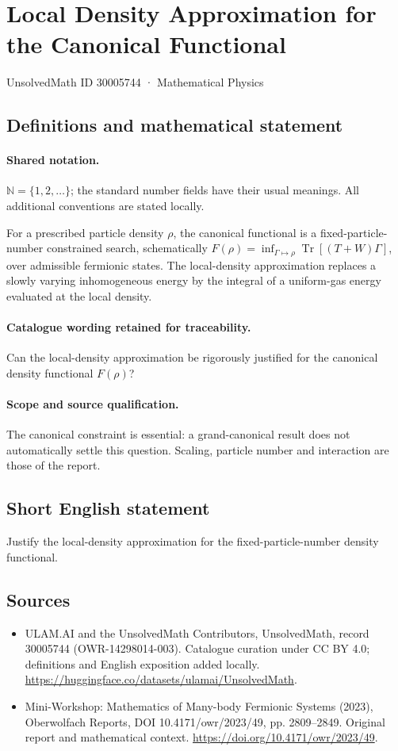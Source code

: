 \documentclass[11pt]{article}
\begin{document}
\setcounter{section}{30005743}
\section{Local Density Approximation for the Canonical Functional}\label{30005744}
{\small UnsolvedMath ID 30005744 · Mathematical Physics}
\subsection{Definitions and mathematical statement}

\paragraph{Shared notation.}$\mathbb N=\{1,2,\ldots\}$; the standard number fields have their usual meanings. All additional conventions are stated locally.


For a prescribed particle density $\rho$, the canonical functional is a fixed-particle-number constrained search, schematically $F(\rho)=\inf_{\Gamma\mapsto\rho}\operatorname{Tr}[(T+W)\Gamma]$, over admissible fermionic states. The local-density approximation replaces a slowly varying inhomogeneous energy by the integral of a uniform-gas energy evaluated at the local density.

\paragraph{Catalogue wording retained for traceability.}
Can the local-density approximation be rigorously justified for the canonical density functional $F(\rho)$?

\paragraph{Scope and source qualification.}The canonical constraint is essential: a grand-canonical result does not automatically settle this question. Scaling, particle number and interaction are those of the report.
\subsection{Short English statement}
Justify the local-density approximation for the fixed-particle-number density functional.
\subsection{Sources}
\begin{itemize}
\item[\hypertarget{source:30005744:1}{S1}] ULAM.AI and the UnsolvedMath Contributors, UnsolvedMath, record 30005744 (OWR-14298014-003). Catalogue curation under CC BY 4.0; definitions and English exposition added locally.
\url{https://huggingface.co/datasets/ulamai/UnsolvedMath}.
\item[\hypertarget{source:30005744:2}{S2}] Mini-Workshop: Mathematics of Many-body Fermionic Systems (2023), Oberwolfach Reports, DOI 10.4171/owr/2023/49, pp. 2809--2849. Original report and mathematical context.
\url{https://doi.org/10.4171/owr/2023/49}.
\end{itemize}
\label{end:30005744}
\end{document}
